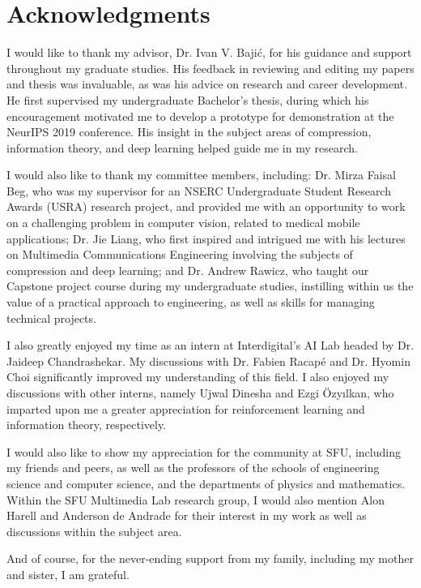 \chapter*{Acknowledgments}

I would like to thank my advisor, Dr. Ivan V. Bajić, for his guidance and support throughout my graduate studies.
His feedback in reviewing and editing my papers and thesis was invaluable, as was his advice on research and career development.
He first supervised my undergraduate Bachelor's thesis, during which his encouragement motivated me to develop a prototype for demonstration at the NeurIPS 2019 conference.
His insight in the subject areas of compression, information theory, and deep learning helped guide me in my research.

I would also like to thank my committee members, including:
Dr. Mirza Faisal Beg, who was my supervisor for an NSERC Undergraduate Student Research Awards (USRA) research project, and provided me with an opportunity to work on a challenging problem in computer vision, related to medical mobile applications;
Dr. Jie Liang, who first inspired and intrigued me with his lectures on Multimedia Communications Engineering involving the subjects of compression and deep learning;
and Dr. Andrew Rawicz, who taught our Capstone project course during my undergraduate studies, instilling within us the value of a practical approach to engineering, as well as skills for managing technical projects.

I also greatly enjoyed my time as an intern at Interdigital's AI Lab headed by Dr. Jaideep Chandrashekar.
My discussions with Dr. Fabien Racapé and Dr. Hyomin Choi significantly improved my understanding of this field.
I also enjoyed my discussions with other interns, namely Ujwal Dinesha and Ezgi Özyılkan, who imparted upon me a greater appreciation for reinforcement learning and information theory, respectively.

I would also like to show my appreciation for the community at SFU, including my friends and peers, as well as the professors of the schools of engineering science and computer science, and the departments of physics and mathematics.
Within the SFU Multimedia Lab research group, I would also mention Alon Harell and Anderson de Andrade for their interest in my work as well as discussions within the subject area.

And of course, for the never-ending support from my family, including my mother and sister, I am grateful.


%
%
%

